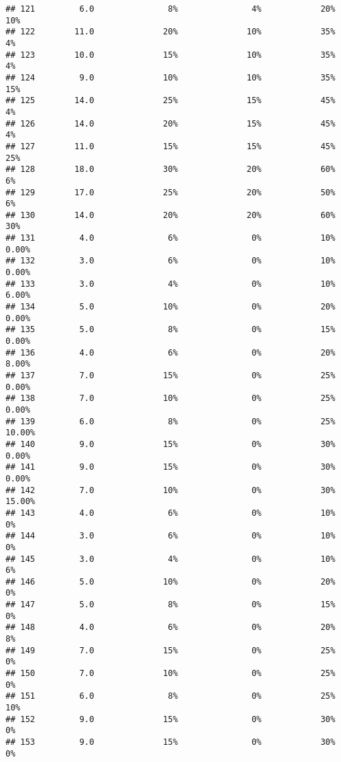 \documentclass[
]{article}
\begin{document}
\begin{verbatim}
## 121         6.0               8%               4%            20%         10%
## 122        11.0              20%              10%            35%          4%
## 123        10.0              15%              10%            35%          4%
## 124         9.0              10%              10%            35%         15%
## 125        14.0              25%              15%            45%          4%
## 126        14.0              20%              15%            45%          4%
## 127        11.0              15%              15%            45%         25%
## 128        18.0              30%              20%            60%          6%
## 129        17.0              25%              20%            50%          6%
## 130        14.0              20%              20%            60%         30%
## 131         4.0               6%               0%            10%       0.00%
## 132         3.0               6%               0%            10%       0.00%
## 133         3.0               4%               0%            10%       6.00%
## 134         5.0              10%               0%            20%       0.00%
## 135         5.0               8%               0%            15%       0.00%
## 136         4.0               6%               0%            20%       8.00%
## 137         7.0              15%               0%            25%       0.00%
## 138         7.0              10%               0%            25%       0.00%
## 139         6.0               8%               0%            25%      10.00%
## 140         9.0              15%               0%            30%       0.00%
## 141         9.0              15%               0%            30%       0.00%
## 142         7.0              10%               0%            30%      15.00%
## 143         4.0               6%               0%            10%          0%
## 144         3.0               6%               0%            10%          0%
## 145         3.0               4%               0%            10%          6%
## 146         5.0              10%               0%            20%          0%
## 147         5.0               8%               0%            15%          0%
## 148         4.0               6%               0%            20%          8%
## 149         7.0              15%               0%            25%          0%
## 150         7.0              10%               0%            25%          0%
## 151         6.0               8%               0%            25%         10%
## 152         9.0              15%               0%            30%          0%
## 153         9.0              15%               0%            30%          0%

\end{verbatim}
\end{document}

